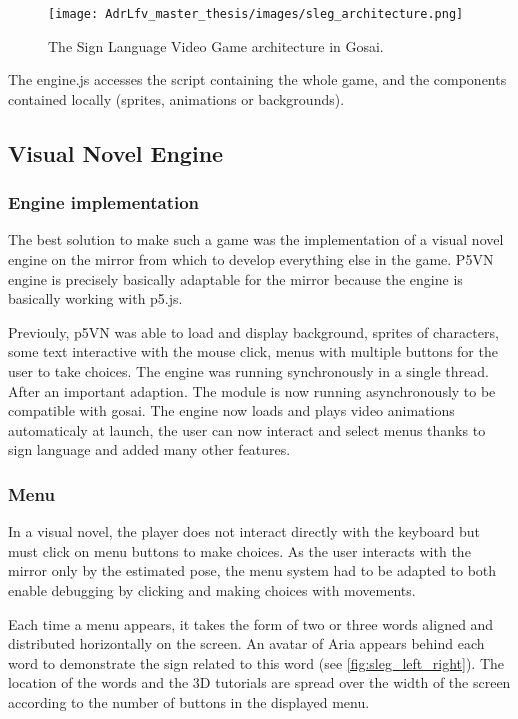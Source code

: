 \begin{figure}[h]
    \centering
    \texttt{[image: AdrLfv\_master\_thesis/images/sleg\_architecture.png]}
    \caption{The Sign Language Video Game architecture in Gosai.}
    \label{fig:sleg_architecture}
\end{figure}

The engine.js accesses the script containing the whole game, and the components contained locally (sprites, animations or backgrounds).

\subsection{Visual Novel Engine}

\subsubsection{Engine implementation}

The best solution to make such a game was the implementation of a visual novel engine on the mirror from which to develop everything else in the game. P5VN engine is precisely  basically adaptable for the mirror because the engine is basically working with p5.js.

Previouly, p5VN was able to load and display background, sprites of characters, some text interactive with the mouse click, menus with multiple buttons for the user to take choices.
The engine was running synchronously in a single thread.
After an important adaption. The module is now running asynchronously to be compatible with gosai. 
The engine now loads and plays video animations automaticaly at launch, the user can now interact and select menus thanks to sign language and added many other features.

\subsubsection{Menu}

In a visual novel, the player does not interact directly with the keyboard but must click on menu buttons to make choices. As the user interacts with the mirror only by the estimated pose, the menu system had to be adapted to both enable debugging by clicking and making choices with movements.

Each time a menu appears, it takes the form of two or three words aligned and distributed horizontally on the screen. An avatar of Aria appears behind each word to demonstrate the sign related to this word (see \ref{fig:sleg_left_right}). The location of the words and the 3D tutorials are spread over the width of the screen according to the number of buttons in the displayed menu. 

